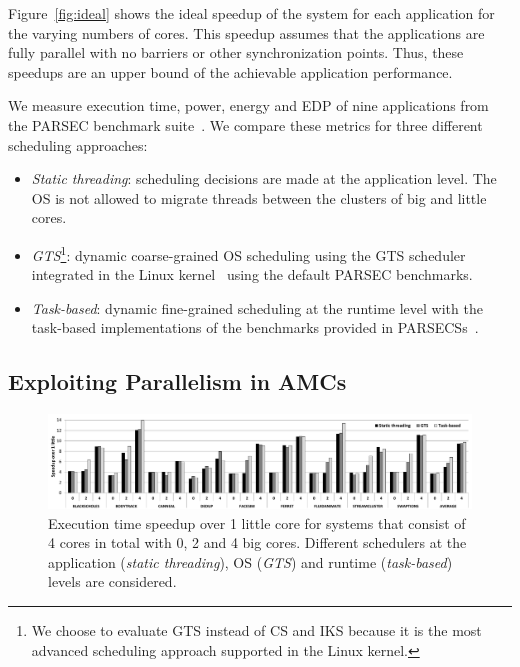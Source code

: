 Figure~\ref{fig:ideal} shows the ideal speedup of the system for each application for the varying 
numbers of cores. This speedup assumes that the applications are fully parallel with no barriers or 
other synchronization points. Thus, these speedups are an upper bound of the achievable application performance.




We measure execution time, power, energy and EDP of nine applications from the PARSEC benchmark suite~\cite{Bienia:PhD2011}. 
We compare these metrics for three different scheduling approaches:
\begin{itemize}
\item \textit{Static threading}: scheduling decisions are made at the application level. The OS is not allowed to migrate threads between the clusters of big and little cores. 
\item \textit{GTS}\footnote{We choose to evaluate GTS instead of CS and IKS because it is the most advanced scheduling approach supported in the Linux kernel.}: dynamic coarse-grained OS scheduling 
using the GTS scheduler integrated in the Linux kernel~\cite{samsung, ARM} using the default 
PARSEC benchmarks. 
\item \textit{Task-based}: dynamic fine-grained scheduling at the runtime level with the task-based implementations of the benchmarks provided in PARSECSs~\cite{Chasapis:TACO2016}.
\end{itemize}


\subsection{Exploiting Parallelism in AMCs}
\label{sec:eval:A}

\begin{figure}[t]%
	\centering
	\includegraphics[width=1.0\textwidth]{figures/speedup-4.pdf}
	\caption{Execution time speedup over 1 little core for systems that consist of 4 cores in 
		total with 0, 2 and 4 big cores. Different schedulers at the application (\textit{static 
			threading}), OS  (\textit{GTS}) and runtime (\textit{task-based}) levels are considered.}
	\label{fig:speedup4}%
\end{figure}



